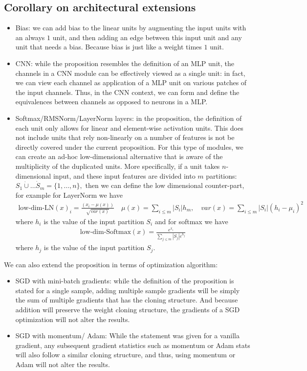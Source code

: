 \documentclass[11pt]{article}
\begin{document}
\subsection{Corollary on architectural extensions}
    \begin{itemize}
        \item Bias: we can add bias to the linear units by augmenting the input units with an always $1$ unit, and then adding an edge between this input unit and any unit that needs a bias. Because bias is just like a weight times $1$ unit. 
        \item CNN: while the proposition resembles the definition of an MLP unit, the channels in a CNN module can be effectively viewed as a single unit: in fact, we can view each channel as application of a MLP unit on various patches of the input channels. Thus, in the CNN context, we can form and define the equivalences between channels as opposed to neurons in a MLP. 
        \item Softmax/RMSNorm/LayerNorm layers: in the proposition, the definition of each unit only allows for linear and element-wise activation units. This does not include units that rely non-linearly on a number of features is not be directly covered under the current proposition. For this type of modules, we can create an ad-hoc low-dimensional alternative that is aware of the multiplicity of the duplicated units. More specifically, if a unit takes $n$-dimensional input, and these input features are divided into $m$ partitions: $S_1\dot\cup \dots \dot S_m = \{1,\dots, n\}, $ then we can define the low dimensional counter-part, for example for LayerNorm  we have  
        \begin{align*}
            \text{low-dim-LN}(x)_i = \frac{(x_i-\mu(x))}{\sqrt{var(x)}} \quad 
            \mu(x) = \sum_{i\le m} |S_i| h_m, \quad var(x) =\sum_{i\le m} |S_i| (h_i-\mu_i )^2
        \end{align*}
        where $h_i$ is the value of the input partition $S_i$
        and for softmax we have
        \begin{align*}
            \text{low-dim-Softmax}(x) = \frac{e^{x_i}}{\sum_{j\le m} |S_j| e^{h_j}}
        \end{align*}
        where $h_j$ is the value of the input partition $S_j$.
    \end{itemize}
    We can also extend the proposition in terms of optimization algorithm:
    \begin{itemize}
        \item SGD with mini-batch gradients: while the definition of the proposition is stated for a single sample, adding multiple sample gradients will be simply the sum of multiple gradients that has the cloning structure. And because addition will preserve the weight cloning structure, the gradients of a SGD optimization will not alter the results. 
        \item SGD with momentum/ Adam: While the statement was given for a vanilla gradient, any subsequent gradient statistics such as momentum or Adam stats will also follow a similar cloning structure, and thus, using momentum or Adam will not alter the results.  
    \end{itemize}
\end{document}
